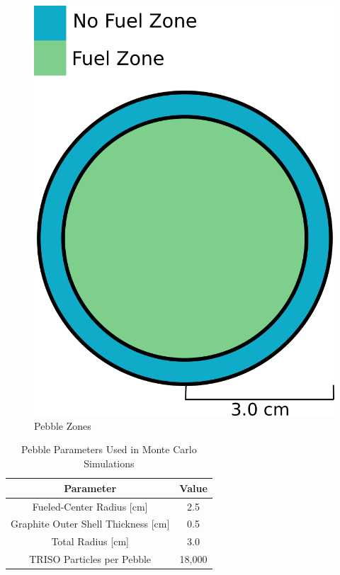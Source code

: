 \begin{figure}[H]
\centering

\includegraphics[width=0.5\linewidth]{figures/pebble-zones.png}
\caption{Pebble Zones}
\label{fig:pebb-zone1}
\end{figure}


\begin{table}[h!]
\centering

\caption{Pebble Parameters Used in Monte Carlo Simulations}
\begin{tabular}{ c  c }
\hline
Parameter & Value \\
\hline
Fueled-Center Radius [cm] & 2.5 \\
Graphite Outer Shell Thickness [cm] & 0.5 \\
Total Radius [cm] & 3.0 \\
TRISO Particles per Pebble & 18,000 \\
\hline
\end{tabular}
\label{table:peb-params}
\end{table}
